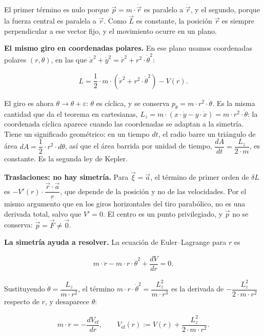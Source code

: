 \documentclass[11pt,a4paper,spanish]{book}
\begin{document}
El primer término es nulo porque \(\vec{p} = m \cdot \dot{\vec{r}}\) es
paralelo a \(\dot{\vec{r}}\), y el segundo, porque la fuerza central es
paralela a \(\vec{r}\). Como \(\vec{L}\) es constante, la posición
\(\vec{r}\) es siempre perpendicular a ese vector fijo, y el movimiento
ocurre en un plano.

\textbf{El mismo giro en coordenadas polares.} En ese plano usamos
coordenadas polares \((r, \theta)\), en las que
\(\dot{x}^2 + \dot{y}^2 = \dot{r}^2 + r^2 \cdot \dot{\theta}^2\):

\[
\begin{aligned}
L = \dfrac{1}{2} \cdot m \cdot (\dot{r}^2 + r^2 \cdot \dot{\theta}^2) - V(r).
\end{aligned}
\]

El giro es ahora \(\theta \to \theta + \varepsilon\): \(\theta\) es
cíclica, y se conserva \(p_\theta = m \cdot r^2 \cdot \dot{\theta}\). Es
la misma cantidad que da el teorema en cartesianas,
\(L_z = m \cdot (x \cdot \dot{y} - y \cdot \dot{x}) = m \cdot r^2 \cdot \dot{\theta}\):
la coordenada cíclica aparece cuando las coordenadas se adaptan a la
simetría. Tiene un significado geométrico: en un tiempo \(dt\), el radio
barre un triángulo de área
\(dA = \dfrac{1}{2} \cdot r^2 \cdot d\theta\), así que el área barrida
por unidad de tiempo, \(\dfrac{dA}{dt} = \dfrac{L_z}{2 \cdot m}\), es
constante. Es la segunda ley de Kepler.

\textbf{Traslaciones: no hay simetría.} Para \(\vec{\xi} = \vec{a}\), el
término de primer orden de \(\delta L\) es
\(-V'(r) \cdot \dfrac{\vec{r} \cdot \vec{a}}{r}\), que depende de la
posición y no de las velocidades. Por el mismo argumento que en los
giros horizontales del tiro parabólico, no es una derivada total, salvo
que \(V' = 0\). El centro es un punto privilegiado, y \(\vec{p}\) no se
conserva: \(\dot{\vec{p}} = \vec{F} \neq \vec{0}\).

\textbf{La simetría ayuda a resolver.} La ecuación de Euler--Lagrange
para \(r\) es

\[
\begin{aligned}
m \cdot \ddot{r} - m \cdot r \cdot \dot{\theta}^2 + \dfrac{dV}{dr} = 0.
\end{aligned}
\]

Sustituyendo \(\dot{\theta} = \dfrac{L_z}{m \cdot r^2}\), el término
\(m \cdot r \cdot \dot{\theta}^2 = \dfrac{L_z^2}{m \cdot r^3}\) es la
derivada de \(-\dfrac{L_z^2}{2 \cdot m \cdot r^2}\) respecto de \(r\), y
desaparece \(\theta\):

\[
\begin{aligned}
m \cdot \ddot{r} = -\dfrac{dV_{\mathrm{ef}}}{dr}, \qquad V_{\mathrm{ef}}(r) := V(r) + \dfrac{L_z^2}{2 \cdot m \cdot r^2}.
\end{aligned}
\]
\end{document}

